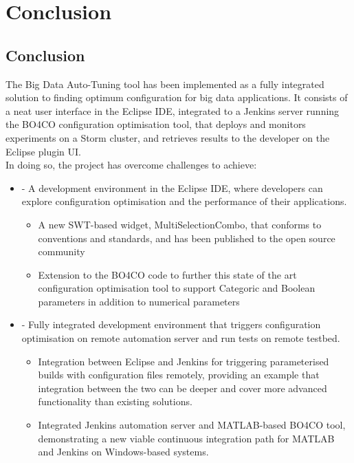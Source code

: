 \newpage
\section{Conclusion}
\subsection{Conclusion}
The Big Data Auto-Tuning tool has been implemented as a fully integrated solution to finding optimum configuration for big data applications. It consists of a neat user interface in the Eclipse IDE, integrated to a Jenkins server running the BO4CO configuration optimisation tool, that deploys and monitors experiments on a Storm cluster, and retrieves results to the developer on the Eclipse plugin UI.\\
In doing so, the project has overcome challenges to achieve:
\begin{itemize}
\item -	A development environment in the Eclipse IDE, where developers can explore configuration optimisation and the performance of their applications.
	\begin{itemize}
	\item A new SWT-based widget, MultiSelectionCombo, that conforms to conventions and standards, and has been published to the open source community
    \item Extension to the BO4CO code to further this state of the art configuration optimisation tool to support Categoric and Boolean parameters in addition to numerical parameters
	\end{itemize}
\item -	Fully integrated development environment that triggers configuration optimisation on remote automation server and run tests on remote testbed.
	\begin{itemize}
	\item Integration between Eclipse and Jenkins for triggering parameterised builds with configuration files remotely, providing an example that integration between the two can be deeper and cover more advanced functionality than existing solutions.
    \item Integrated Jenkins automation server and MATLAB-based BO4CO tool, demonstrating a new viable continuous integration path for MATLAB and Jenkins on Windows-based systems.
	\end{itemize}
\end{itemize}

\newpage

